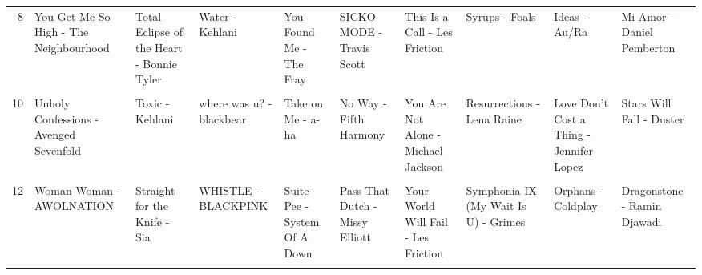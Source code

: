 \documentclass[
]{article}
\begin{document}
\begin{table}
\begin{tabular}{r|l|l|l|l|l|l|l|l|l}
\hline
\cellcolor{gray!6}{7} & \cellcolor{gray!6}{Touch - Little Mix} & \cellcolor{gray!6}{Summertime Magic - Childish Gambino} & \cellcolor{gray!6}{Voices - Hurts} & \cellcolor{gray!6}{Time of Dying - Three Days Grace} & \cellcolor{gray!6}{White Privilege - Macklemore} & \cellcolor{gray!6}{The Ultracheese - Arctic Monkeys} & \cellcolor{gray!6}{Sail - AWOLNATION} & \cellcolor{gray!6}{Riquiquí - Arca} & \cellcolor{gray!6}{Dr. Ford - Ramin Djawadi}\\
\hline
8 & You Get Me So High - The Neighbourhood & Total Eclipse of the Heart - Bonnie Tyler & Water - Kehlani & You Found Me - The Fray & SICKO MODE - Travis Scott & This Is a Call - Les Friction & Syrups - Foals & Ideas - Au/Ra & Mi Amor - Daniel Pemberton\\
\hline
\cellcolor{gray!6}{9} & \cellcolor{gray!6}{Zombie - Bad Wolves} & \cellcolor{gray!6}{verbatim - blackbear} & \cellcolor{gray!6}{Whenever, Wherever - Shakira} & \cellcolor{gray!6}{Suffer - Hurts} & \cellcolor{gray!6}{slide thru (feat. Jerry Good) - blackbear} & \cellcolor{gray!6}{Where's My Love - Acoustic - SYML} & \cellcolor{gray!6}{Ushas - E.S. Posthumus} & \cellcolor{gray!6}{Killing Me Softly With His Song - Fugees} & \cellcolor{gray!6}{Quarantine - Justin Hurwitz}\\
\hline
10 & Unholy Confessions - Avenged Sevenfold & Toxic - Kehlani & where was u? - blackbear & Take on Me - a-ha & No Way - Fifth Harmony & You Are Not Alone - Michael Jackson & Resurrections - Lena Raine & Love Don't Cost a Thing - Jennifer Lopez & Stars Will Fall - Duster\\
\hline
\cellcolor{gray!6}{11} & \cellcolor{gray!6}{Welcome to the Black Parade - My Chemical Romance} & \cellcolor{gray!6}{uhgood - RM} & \cellcolor{gray!6}{Vultures - John Mayer} & \cellcolor{gray!6}{Write On Me - Fifth Harmony} & \cellcolor{gray!6}{Nonbinary - Arca} & \cellcolor{gray!6}{You're Somebody Else - flora cash} & \cellcolor{gray!6}{Scary Monsters and Nice Sprites - Skrillex} & \cellcolor{gray!6}{Love On Top - Beyoncé} & \cellcolor{gray!6}{Death and I - Darren Korb}\\
\hline
12 & Woman Woman - AWOLNATION & Straight for the Knife - Sia & WHISTLE - BLACKPINK & Suite-Pee - System Of A Down & Pass That Dutch - Missy Elliott & Your World Will Fail - Les Friction & Symphonia IX (My Wait Is U) - Grimes & Orphans - Coldplay & Dragonstone - Ramin Djawadi\\
\hline
\cellcolor{gray!6}{13} & \cellcolor{gray!6}{The Suburbs - Arcade Fire} & \cellcolor{gray!6}{Stranger Tings - RINI} & \cellcolor{gray!6}{What a Girl Wants - Christina Aguilera} & \cellcolor{gray!6}{That's My Girl - Fifth Harmony} & \cellcolor{gray!6}{Penis Song - Macklemore} & \cellcolor{gray!6}{Two Weeks in December - Skullcrusher} & \cellcolor{gray!6}{Scattered and Lost - Lena Raine} & \cellcolor{gray!6}{Remember When - Wallows} & \cellcolor{gray!6}{Everest - All Them Witches}\\

\end{tabular}
\end{table}
\end{document}
